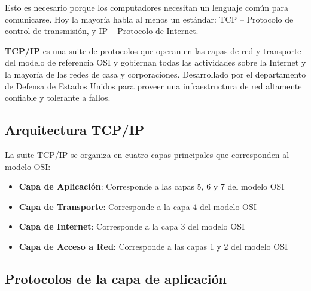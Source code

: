 Esto es necesario porque los computadores necesitan un lenguaje común para comunicarse. Hoy la mayoría habla al menos un estándar: 
TCP – Protocolo de control de transmisión, y  
IP – Protocolo de Internet. 

\textbf{TCP/IP} es una suite de protocolos que operan en las capas de red y transporte del modelo de referencia OSI y gobiernan todas las actividades sobre la Internet y la mayoría de las redes de casa y corporaciones. Desarrollado por el departamento de Defensa de Estados Unidos para proveer una infraestructura de red altamente confiable y tolerante a fallos.

\subsection{Arquitectura TCP/IP}

La suite TCP/IP se organiza en cuatro capas principales que corresponden al modelo OSI:

\begin{itemize}
    \item \textbf{Capa de Aplicación}: Corresponde a las capas 5, 6 y 7 del modelo OSI
    \item \textbf{Capa de Transporte}: Corresponde a la capa 4 del modelo OSI
    \item \textbf{Capa de Internet}: Corresponde a la capa 3 del modelo OSI
    \item \textbf{Capa de Acceso a Red}: Corresponde a las capas 1 y 2 del modelo OSI
\end{itemize}

\subsection{Protocolos de la capa de aplicación}

